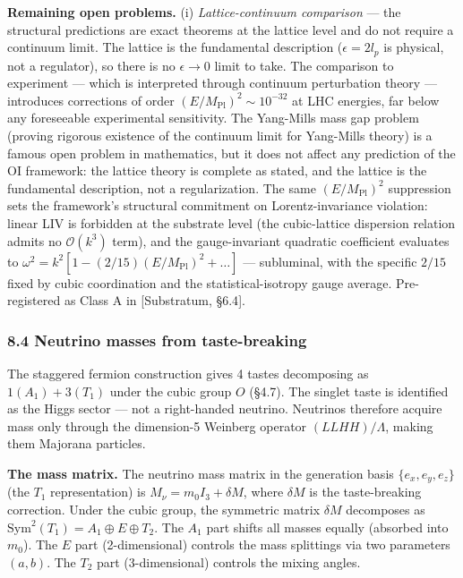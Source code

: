 \documentclass[
]{article}
\begin{document}
\textbf{Remaining open problems.} (i) \emph{Lattice-continuum
comparison} --- the structural predictions are exact theorems at the
lattice level and do not require a continuum limit. The lattice is the
fundamental description (\(\epsilon = 2l_p\) is physical, not a
regulator), so there is no \(\epsilon \to 0\) limit to take. The
comparison to experiment --- which is interpreted through continuum
perturbation theory --- introduces corrections of order
\((E/M_{\text{Pl}})^2 \sim 10^{-32}\) at LHC energies, far below any
foreseeable experimental sensitivity. The Yang-Mills mass gap problem
(proving rigorous existence of the continuum limit for Yang-Mills
theory) is a famous open problem in mathematics, but it does not affect
any prediction of the OI framework: the lattice theory is complete as
stated, and the lattice is the fundamental description, not a
regularization. The same \((E/M_{\text{Pl}})^2\) suppression sets the
framework's structural commitment on Lorentz-invariance violation:
linear LIV is forbidden at the substrate level (the cubic-lattice
dispersion relation admits no \(\mathcal{O}(k^3)\) term), and the
gauge-invariant quadratic coefficient evaluates to
\(\omega^2 = k^2[1 - (2/15)(E/M_{\text{Pl}})^2 + \ldots]\) ---
subluminal, with the specific \(2/15\) fixed by cubic coordination and
the statistical-isotropy gauge average. Pre-registered as Class A in
{[}Substratum, §6.4{]}.

\hypertarget{neutrino-masses-from-taste-breaking}{%
\subsubsection{8.4 Neutrino masses from
taste-breaking}\label{neutrino-masses-from-taste-breaking}}

The staggered fermion construction gives 4 tastes decomposing as
\(1(A_1) + 3(T_1)\) under the cubic group \(O\) (§4.7). The singlet
taste is identified as the Higgs sector --- not a right-handed neutrino.
Neutrinos therefore acquire mass only through the dimension-5 Weinberg
operator \((LLHH)/\Lambda\), making them Majorana particles.

\textbf{The mass matrix.} The neutrino mass matrix in the generation
basis \(\{e_x, e_y, e_z\}\) (the \(T_1\) representation) is
\(M_\nu = m_0 I_3 + \delta M\), where \(\delta M\) is the taste-breaking
correction. Under the cubic group, the symmetric matrix \(\delta M\)
decomposes as \(\mathrm{Sym}^2(T_1) = A_1 \oplus E \oplus T_2\). The
\(A_1\) part shifts all masses equally (absorbed into \(m_0\)). The
\(E\) part (2-dimensional) controls the mass splittings via two
parameters \((a, b)\). The \(T_2\) part (3-dimensional) controls the
mixing angles.
\end{document}
